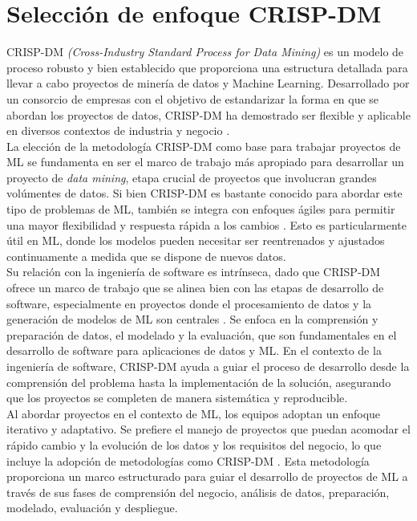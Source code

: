 \documentclass[journal]{IEEEtran}
\begin{document}
\section{Selección de enfoque CRISP-DM}

CRISP-DM \textit{(Cross-Industry Standard Process for Data Mining)} es un modelo de proceso robusto y bien establecido que proporciona una estructura detallada para llevar a cabo proyectos de minería de datos y Machine Learning. Desarrollado por un consorcio de empresas con el objetivo de estandarizar la forma en que se abordan los proyectos de datos, CRISP-DM ha demostrado ser flexible y aplicable en diversos contextos de industria y negocio \cite{datasciencepmWhatCRISP}.\\

La elección de la metodología CRISP-DM como base para trabajar proyectos de ML se fundamenta en ser el marco de trabajo más apropiado para desarrollar un proyecto de \textit{data mining}, etapa crucial de proyectos que involucran grandes volúmentes de datos. Si bien CRISP-DM es bastante conocido para abordar este tipo de problemas de ML, también se integra con enfoques ágiles para permitir una mayor flexibilidad y respuesta rápida a los cambios \cite{datasciencepmWhatCRISP}. Esto es particularmente útil en ML, donde los modelos pueden necesitar ser reentrenados y ajustados continuamente a medida que se dispone de nuevos datos.\\

Su relación con la ingeniería de software es intrínseca, dado que CRISP-DM ofrece un marco de trabajo que se alinea bien con las etapas de desarrollo de software, especialmente en proyectos donde el procesamiento de datos y la generación de modelos de ML son centrales \cite{Forward2008}. Se enfoca en la comprensión y preparación de datos, el modelado y la evaluación, que son fundamentales en el desarrollo de software para aplicaciones de datos y ML. En el contexto de la ingeniería de software, CRISP-DM ayuda a guiar el proceso de desarrollo desde la comprensión del problema hasta la implementación de la solución, asegurando que los proyectos se completen de manera sistemática y reproducible.\\

Al abordar proyectos en el contexto de ML, los equipos adoptan un enfoque iterativo y adaptativo. Se prefiere el manejo de proyectos que puedan acomodar el rápido cambio y la evolución de los datos y los requisitos del negocio, lo que incluye la adopción de metodologías como CRISP-DM \cite{datasciencepmWhatCRISP}. Esta metodología proporciona un marco estructurado para guiar el desarrollo de proyectos de ML a través de sus fases de comprensión del negocio, análisis de datos, preparación, modelado, evaluación y despliegue.\\
\end{document}
